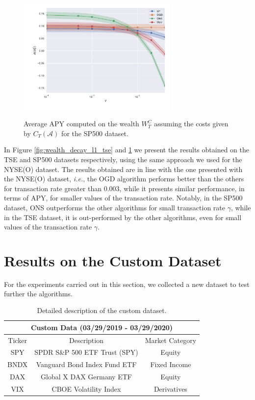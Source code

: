 \begin{figure}[ht!]
\centering
{\includegraphics[width=0.70\textwidth,keepaspectratio]{img/fig_w_decay_l1_sp500.pdf}} 
\caption{Average APY computed on the wealth $W_T^C$ assuming the costs given by $C_T(\mathcal{A})$ for the SP500 dataset.}
\label{fig:wealth_decay_l1_sp500}
\end{figure}

In Figure \ref{fig:wealth_decay_l1_tse} and \ref{fig:wealth_decay_l1_sp500} we present the results obtained on the TSE and SP500 datasets respectively, using the same approach we used for the NYSE(O) dataset.  The results obtained are in line with the one presented with the NYSE(O) dataset, \emph{i.e.}, the OGD algorithm performs better than the others for transaction rate greater than $0.003$, while it presents similar performance, in terms of APY, for smaller values of the transaction rate. Notably, in the SP500 dataset, ONS outperforms the other algorithms for small transaction rate $\gamma$, while in the TSE dataset, it is out-performed by the other algorithms, even for small values of the transaction rate $\gamma$.

\section{Results on the Custom Dataset}

For the experiments carried out in this section, we collected a new dataset to test further the algorithms.

\begin{table}[ht!]\centering
\begin{tabular}{ |c||c|c| }
 \hline
 \multicolumn{3}{|c|}{Custom Data (03/29/2019 - 03/29/2020)} \\
 \hline
 Ticker & Description & Market Category\\
 \hline
 SPY & SPDR S\&P 500 ETF Trust (SPY)  & Equity\\
 BNDX &  Vanguard Bond Index Fund ETF & Fixed Income\\
 DAX & Global X DAX Germany ETF & Equity\\
 VIX & CBOE Volatility Index & Derivatives\\
 \hline
\end{tabular}
\caption{Detailed description of the custom dataset.}\label{tab:dataset_custom}
\end{table}

